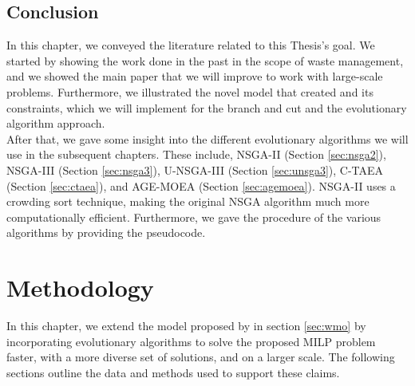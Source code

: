 \documentclass[mscthesis, 11pt]{usiinfthesis}
\theoremstyle{newdefinition}
\begin{document}
\section{Conclusion}
In this chapter, we conveyed the literature related to this Thesis's goal. We started by showing the work done in the past in the scope of waste management, and we showed the main paper that we will improve to work with large-scale problems. Furthermore, we illustrated the novel model that \cite{olapiriyakul_multiobjective_2019} created and its constraints, which we will implement for the branch and cut and the evolutionary algorithm approach.
\\
After that, we gave some insight into the different evolutionary algorithms we will use in the subsequent chapters. These include, NSGA-II (Section \ref{sec:nsga2}), NSGA-III (Section \ref{sec:nsga3}), U-NSGA-III (Section \ref{sec:unsga3}), C-TAEA (Section \ref{sec:ctaea}), and AGE-MOEA (Section \ref{sec:agemoea}). NSGA-II uses a crowding sort technique, making the original NSGA algorithm much more computationally efficient. Furthermore, we gave the procedure of the various algorithms by providing the pseudocode.
\chapter[Methodology]{Methodology}
In this chapter, we extend the model proposed by \cite{olapiriyakul_multiobjective_2019} in section \ref{sec:wmo} by incorporating evolutionary algorithms to solve the proposed MILP problem faster, with a more diverse set of solutions, and on a larger scale. 
The following sections outline the data and methods used to support these claims. 
\end{document}
